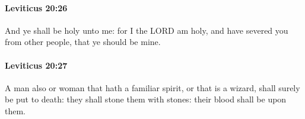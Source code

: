 		\paragraph{Leviticus 20:26} %
			\label{LEVITICUS-20-26}

			And ye shall be holy unto me: for I the LORD am holy, and have severed you from other people, that ye should be mine.


		\paragraph{Leviticus 20:27} %
			\label{LEVITICUS-20-27}

			A man also or woman that hath a familiar spirit, or that is a wizard, shall surely be put to death: they shall stone them with stones: their blood shall be upon them.

